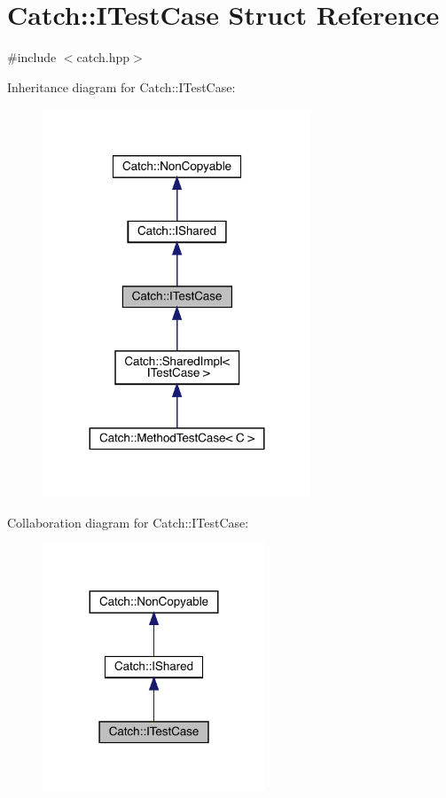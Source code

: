 \hypertarget{struct_catch_1_1_i_test_case}{}\section{Catch\+:\+:I\+Test\+Case Struct Reference}
\label{struct_catch_1_1_i_test_case}


{\ttfamily \#include $<$catch.\+hpp$>$}



Inheritance diagram for Catch\+:\+:I\+Test\+Case\+:
\nopagebreak
\begin{figure}[H]
\begin{center}
\leavevmode
\includegraphics[width=227pt]{struct_catch_1_1_i_test_case__inherit__graph}
\end{center}
\end{figure}


Collaboration diagram for Catch\+:\+:I\+Test\+Case\+:
\nopagebreak
\begin{figure}[H]
\begin{center}
\leavevmode
\includegraphics[width=188pt]{struct_catch_1_1_i_test_case__coll__graph}
\end{center}
\end{figure}
